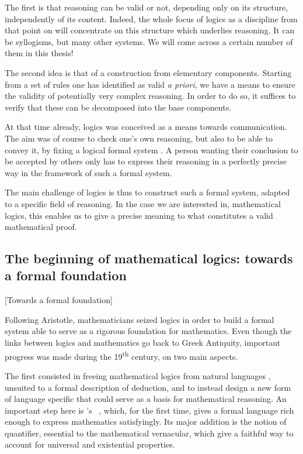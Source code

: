 The first is that reasoning can be valid or not, depending only on its structure,
independently of its content. Indeed, the whole focus of logics as a discipline from that
point on will concentrate on this structure which underlies reasoning.
It can be syllogisms, but many other systems. We will come across a certain number of them
in this thesis!

The second idea is that of a construction from elementary components.
Starting from a set of rules
one has identified as valid \textit{a priori}, we have a means to ensure the validity
of potentially very complex reasoning. In order to do so, it suffices to verify that these
can be decomposed into the base components.

At that time already, logics was conceived as a means towards communication.
The aim was of course to check one’s own reasoning, but also to be able to convey
it, by fixing a logical formal system%
.
A person wanting their conclusion to be accepted by others only has to express their
reasoning in a perfectly precise way in the framework of such a formal system.

The main challenge of logics is thus to construct such a formal system, adapted to a specific
field of reasoning. In the case we are interested in, mathematical logics, this
enables us to give a precise meaning to what constitutes a valid mathematical proof.


\subsection{The beginning of mathematical logics: towards a formal foundation}[Towards a formal foundation]

Following Aristotle, mathematicians seized logics in order to build a formal system
able to serve as a rigorous foundation for mathematics.
Even though the links between logics and mathematics go back to Greek Antiquity,
important progress was made during the 19\textsuperscript{th} century, on two main aspects.

The first consisted in freeing mathematical logics from natural languages%
,
unsuited to a formal description of deduction, and to instead design a new form of language
specific that could serve as a basis for mathematical reasoning.
An important step here is \citeauthor{Begriffsschrift}'s
~, which, for the first time,
gives a formal language rich enough to express mathematics satisfyingly. Its
major addition is the notion of quantifier, essential to the mathematical vernacular,
which give a faithful way to account for universal%
and existential%
properties.

